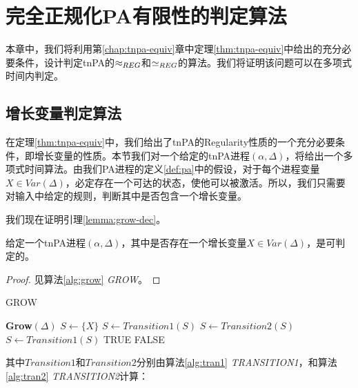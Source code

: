 \chapter{完全正规化PA有限性的判定算法}
\label{chap:tnpa-alg}

本章中，我们将利用第\ref{chap:tnpa-equiv}章中定理\ref{thm:tnpa-equiv}中给出的充分必要条件，设计判定tnPA的$\approx_{REG}$和$\simeq_{REG}$的算法。我们将证明该问题可以在多项式时间内判定。

\section{增长变量判定算法}
\label{sec:grow-alg}

在定理\ref{thm:tnpa-equiv}中，我们给出了tnPA的Regularity性质的一个充分必要条件，即增长变量的性质。本节我们对一个给定的tnPA进程$(\alpha,\Delta)$，将给出一个多项式时间算法。由我们PA进程的定义\ref{def:pa}中的假设，对于每个进程变量$X\in Var(\Delta)$，必定存在一个可达的状态，使他可以被激活。所以，我们只需要对输入中给定的规则，判断其中是否包含一个增长变量。

我们现在证明引理\ref{lemma:grow-dec}。

\begin{lem}\label{lemma:grow-dec}
给定一个tnPA进程$(\alpha,\Delta)$，其中是否存在一个增长变量$X\in Var(\Delta)$，是可判定的。
\end{lem}

\begin{proof}
见算法\ref{alg:grow} \textsl{GROW}。
\end{proof}

\begin{algorithm}[htbp]
\caption{GROW}
\label{alg:grow}
\begin{algorithmic}[1]
\Statex \textbf{Grow$(\Delta)$ }
    \State $S\leftarrow \{X\}$
        \State $S\leftarrow Transition1(S)$
    \EndWhile
    \State $S\leftarrow Transition2(S)$
        \State $S\leftarrow Transition1(S)$
    \EndWhile
        \State \Return TRUE
    \EndIf
\EndFor
\State \Return FALSE

\end{algorithmic}
\end{algorithm}

其中$Transition1$和$Transition2$分别由算法\ref{alg:tran1} \textsl{TRANSITION1}，和算法\ref{alg:tran2} \textsl{TRANSITION2}计算：

